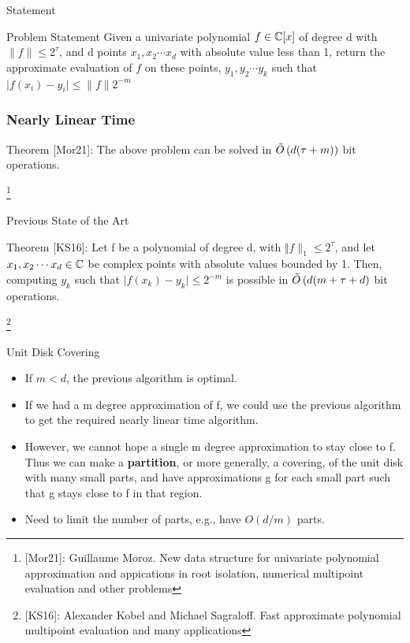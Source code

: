 \newcommand\blfootnote[1]{%
  \begingroup
  \renewcommand\thefootnote{}\footnote{#1}%
  \addtocounter{footnote}{-1}%
  \endgroup
}

\begin{frame}{Statement}
    \begin{block}{Problem Statement}
        Given a univariate polynomial $f \in \mathbb{C}[x]$ of degree d with $\lVert f \rVert \le 2^\tau$, and d points $x_1, x_2 \cdots x_d$ with absolute value less than 1, return the approximate evaluation of $f$ on these points, $y_1, y_2 \cdots y_k$ such that $\lvert f(x_i) - y_i \rvert \le \lVert f \rVert 2^{-m}$
    \end{block}
\end{frame}

\begin{frame}
    \frametitle{Nearly Linear Time}
    \begin{block}
        {Theorem}
        [Mor21]: The above problem can be solved in $\Tilde{O}\left(d (\tau + m)\right)$ bit operations.
    \end{block}

    \blfootnote{[Mor21]: Guillaume Moroz. New data structure for univariate polynomial approximation and appications in root isolation, numerical multipoint evaluation and other problems}
\end{frame}

\begin{frame}{Previous State of the Art}
    \begin{block}
        {Theorem}
        [KS16]: Let f be a polynomial of degree d, with $\Vert f \rVert_1 \le 2^\tau$, and let $x_1, x_2 \cdots x_d \in \mathbb{C}$ be complex points with absolute values bounded by 1. Then, computing $y_k$ such that $\lvert f(x_k) - y_k \rvert \le 2^{-m}$ is possible in $\Tilde{O}\left(d (m + \tau + d\right)$ bit operations.
    \end{block}    

    \blfootnote{[KS16]: Alexander Kobel and Michael Sagraloff. Fast approximate polynomial multipoint evaluation and many applications}
\end{frame}

\begin{frame}{Unit Disk Covering}
\begin{itemize}
    \item If $m < d$, the previous algorithm is optimal.
    \item If we had a m degree approximation of f, we could use the previous algorithm to get the required nearly linear time algorithm.
    \item However, we cannot hope a single m degree approximation to stay close to f. Thus we can make a \textbf{partition}, or more generally, a covering, of the unit disk with many small parts, and have approximations g for each small part such that g stays close to f in that region.
    \item Need to limit the number of parts, e.g., have $O \left(d / m \right)$ parts.
\end{itemize}
\end{frame}

